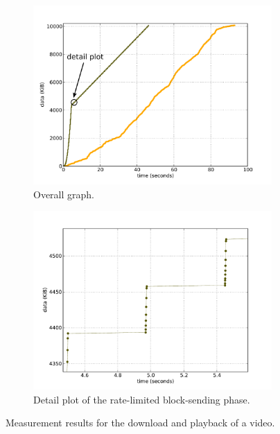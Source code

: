 \begin{figure}[htbp]
	\centering
    	\begin{subfigure}[b]{0.80\textwidth}
                \centering
                \includegraphics[width=\textwidth]{images/blocktransfer-mod.pdf}
                \caption{Overall graph.}
                \label{c3:fig:blocktransfer-overall}
        \end{subfigure}

    	\begin{subfigure}[b]{0.80\textwidth}
                \centering
                \includegraphics[width=\textwidth]{images/blocktransferdetail.pdf}
                \caption{Detail plot of the rate-limited block-sending phase.}
                \label{c3:fig:blocktransfer-detail}
        \end{subfigure}
\caption{Measurement results for the download and playback of a video.}
\label{c3:fig:blocktransfer}
\end{figure}



